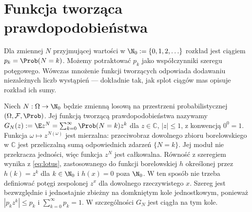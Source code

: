 \section{Funkcja tworząca prawdopodobieństwa}

Dla zmiennej $N$ przyjmującej wartości w $\N_0:=\{0,1,2,\ldots\}$
rozkład jest ciągiem $p_k=\Prob(N=k)$. Możemy potraktować
$p_k$ jako współczynniki szeregu potęgowego. Wówczas
mnożenie funkcji tworzących odpowiada dodawaniu niezależnych
liczb wystąpień --- dokładnie tak, jak splot ciągów mas
opisuje rozkład ich sumy.

\begin{definicja}
Niech $N:\Omega\to\N_0$ będzie zmienną losową na przestrzeni
probabilistycznej $(\Omega,\mathcal F,\Prob)$.
Jej funkcją tworzącą prawdopodobieństwa nazywamy
$G_N(z):=\E z^N=\sum_{k=0}^\infty \Prob(N=k)z^k$
dla $z\in\mathbb C$, $|z|\leq1$, z konwencją $0^0=1$.
Funkcja $\omega\mapsto z^{N(\omega)}$ jest mierzalna:
przeciwobraz dowolnego zbioru borelowskiego w $\mathbb C$
jest przeliczalną sumą odpowiednich zdarzeń $\{N=k\}$. Jej moduł
nie przekracza jedności, więc funkcja $z^N$ jest całkowalna.
Równość z szeregiem wynika z \eqref{eq:lotus},
zastosowanego do funkcji borelowskiej $h$ określonej
przez $h(k)=z^k$ dla $k\in\N_0$ i $h(x)=0$ poza $\N_0$.
W ten sposób nie trzeba definiować potęgi zespolonej
$z^x$ dla dowolnego rzeczywistego $x$.
Szereg jest bezwzględnie i jednostajnie zbieżny na domkniętym
kole jednostkowym, ponieważ $|p_kz^k|\leq p_k$ i
$\sum_{k=0}^\infty p_k=1$. W szczególności $G_N$ jest
ciągła na tym kole.
\end{definicja}


